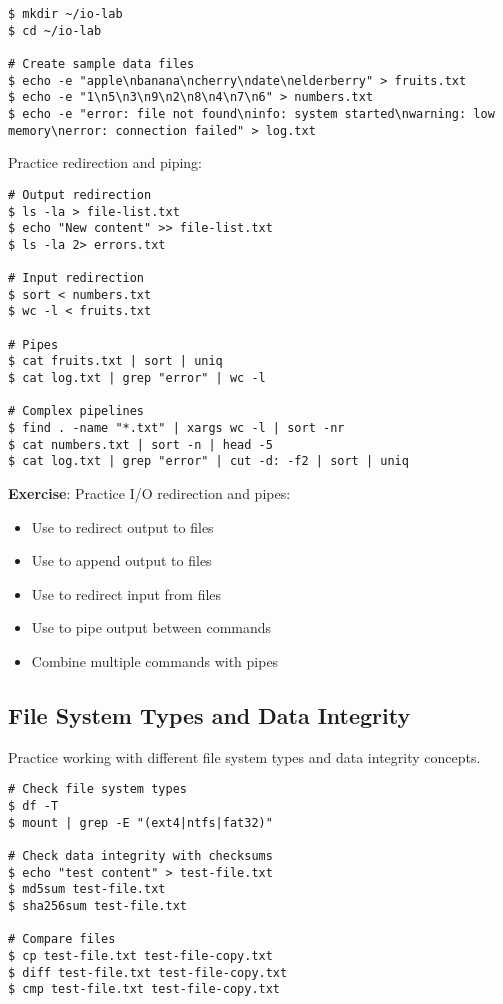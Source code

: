 \begin{lstlisting}[style=bashstyle]
$ mkdir ~/io-lab
$ cd ~/io-lab

# Create sample data files
$ echo -e "apple\nbanana\ncherry\ndate\nelderberry" > fruits.txt
$ echo -e "1\n5\n3\n9\n2\n8\n4\n7\n6" > numbers.txt
$ echo -e "error: file not found\ninfo: system started\nwarning: low memory\nerror: connection failed" > log.txt
\end{lstlisting}

Practice redirection and piping:

\begin{lstlisting}[style=bashstyle]
# Output redirection
$ ls -la > file-list.txt
$ echo "New content" >> file-list.txt
$ ls -la 2> errors.txt

# Input redirection
$ sort < numbers.txt
$ wc -l < fruits.txt

# Pipes
$ cat fruits.txt | sort | uniq
$ cat log.txt | grep "error" | wc -l

# Complex pipelines
$ find . -name "*.txt" | xargs wc -l | sort -nr
$ cat numbers.txt | sort -n | head -5
$ cat log.txt | grep "error" | cut -d: -f2 | sort | uniq
\end{lstlisting}

\textbf{Exercise}: Practice I/O redirection and pipes:
\begin{itemize}
    \item Use \cmd{>} to redirect output to files
    \item Use \cmd{>>} to append output to files
    \item Use \cmd{<} to redirect input from files
    \item Use \cmd{|} to pipe output between commands
    \item Combine multiple commands with pipes
\end{itemize}

\subsection{File System Types and Data Integrity}

Practice working with different file system types and data integrity concepts.

\begin{lstlisting}[style=bashstyle]
# Check file system types
$ df -T
$ mount | grep -E "(ext4|ntfs|fat32)"

# Check data integrity with checksums
$ echo "test content" > test-file.txt
$ md5sum test-file.txt
$ sha256sum test-file.txt

# Compare files
$ cp test-file.txt test-file-copy.txt
$ diff test-file.txt test-file-copy.txt
$ cmp test-file.txt test-file-copy.txt
\end{lstlisting}


